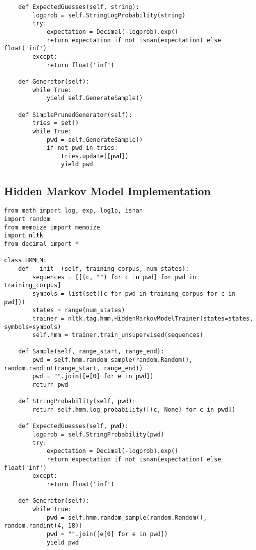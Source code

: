 \documentclass{amsart}
\theoremstyle{definition}
\theoremstyle{remark}
\numberwithin{equation}{section}
\begin{document}
\begin{lstlisting}
    def ExpectedGuesses(self, string):
        logprob = self.StringLogProbability(string)
        try:
            expectation = Decimal(-logprob).exp()
            return expectation if not isnan(expectation) else float('inf')
        except:
            return float('inf')

    def Generator(self):
        while True:
            yield self.GenerateSample()

    def SimplePrunedGenerator(self):
        tries = set()
        while True:
            pwd = self.GenerateSample()
            if not pwd in tries:
                tries.update([pwd])
                yield pwd

\end{lstlisting}
\newpage
\subsection{Hidden Markov Model Implementation}
\begin{lstlisting}
from math import log, exp, log1p, isnan
import random
from memoize import memoize
import nltk
from decimal import *

class HMMLM:
    def __init__(self, training_corpus, num_states):
        sequences = [[(c, "") for c in pwd] for pwd in training_corpus]
        symbols = list(set([c for pwd in training_corpus for c in pwd]))
        states = range(num_states)
        trainer = nltk.tag.hmm.HiddenMarkovModelTrainer(states=states, symbols=symbols)
        self.hmm = trainer.train_unsupervised(sequences)

    def Sample(self, range_start, range_end):
        pwd = self.hmm.random_sample(random.Random(), random.randint(range_start, range_end))
        pwd = "".join([e[0] for e in pwd])
        return pwd

    def StringProbability(self, pwd):
        return self.hmm.log_probability([(c, None) for c in pwd])

    def ExpectedGuesses(self, pwd):
        logprob = self.StringProbability(pwd)
        try:
            expectation = Decimal(-logprob).exp()
            return expectation if not isnan(expectation) else float('inf')
        except:
            return float('inf')

    def Generator(self):
        while True:
            pwd = self.hmm.random_sample(random.Random(), random.randint(4, 18))
            pwd = "".join([e[0] for e in pwd])
            yield pwd


\end{lstlisting}
\end{document}
